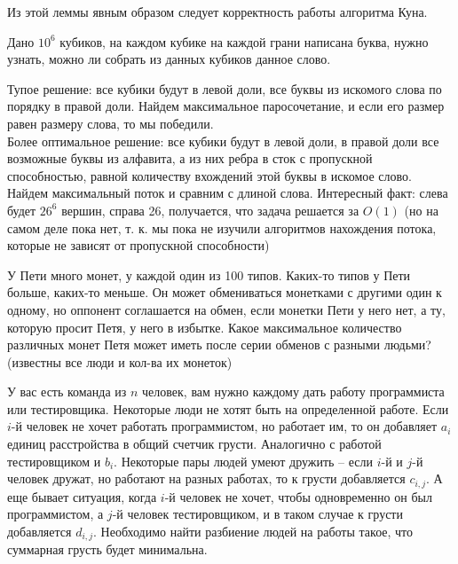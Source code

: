 \noindent Из этой леммы явным образом следует корректность работы алгоритма Куна.
\begin{problem}
    Дано $10^6$ кубиков, на каждом кубике на каждой грани написана буква, нужно узнать, можно ли собрать из данных кубиков данное слово.
\end{problem}
\begin{solution}
    Тупое решение: все кубики будут в левой доли, все буквы из искомого слова по порядку в правой доли. Найдем максимальное паросочетание, и если его размер равен размеру слова, то мы победили. \\
    Более оптимальное решение: все кубики будут в левой доли, в правой доли все возможные буквы из алфавита, а из них ребра в сток с пропускной способностью, равной количеству вхождений этой буквы в искомое слово. Найдем максимальный поток и сравним с длиной слова. Интересный факт: слева будет $26^6$ вершин, справа 26, получается, что задача решается за $O(1)$ (но на самом деле пока нет, т. к. мы пока не изучили алгоритмов нахождения потока, которые не зависят от пропускной способности)
\end{solution}

\begin{problem}
    У Пети много монет, у каждой один из 100 типов. Каких-то типов у Пети больше, каких-то меньше. Он может обмениваться монетками с другими один к одному, но оппонент соглашается на обмен, если монетки Пети у него нет, а ту, которую просит Петя, у него в избытке. Какое максимальное количество различных монет Петя может иметь после серии обменов с разными людьми? (известны все люди и кол-ва их монеток)
\end{problem}

\begin{problem}
    У вас есть команда из $n$ человек, вам нужно каждому дать работу программиста или тестировщика. Некоторые люди не хотят быть на определенной работе. Если $i$-й человек не хочет работать программистом, но работает им, то он добавляет $a_i$ единиц расстройства в общий счетчик грусти. Аналогично с работой тестировщиком и $b_i$. Некоторые пары людей умеют дружить -- если $i$-й и $j$-й человек дружат, но работают на разных работах, то к грусти добавляется $c_{i, j}$. А еще бывает ситуация, когда $i$-й человек не хочет, чтобы одновременно он был программистом, а $j$-й человек тестировщиком, и в таком случае к грусти добавляется $d_{i, j}$. Необходимо найти разбиение людей на работы такое, что суммарная грусть будет минимальна.
\end{problem}


